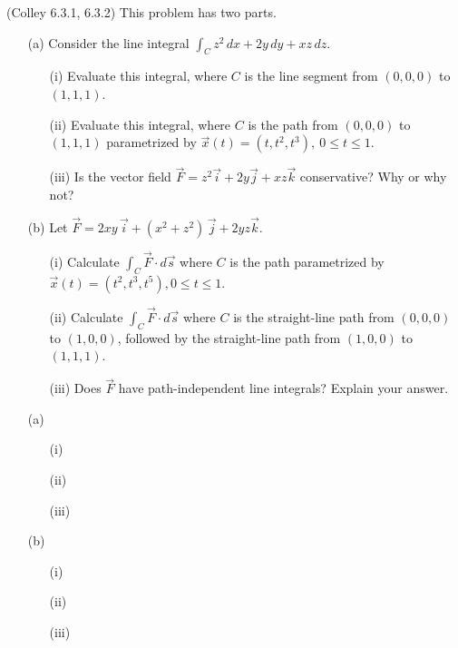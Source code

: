 \documentclass[11pt,letterpaper,cm]{nupset}
\begin{document}
\begin{problem}[Exercise 1] (Colley 6.3.1, 6.3.2) This problem has two parts.
	\begin{itemize}
		\item[(a)] Consider the line integral $\displaystyle \int_C z^2\,dx+2y\,dy+xz\,dz$.
		\begin{itemize}
			\item[(i)] Evaluate this integral, where $C$ is the line segment from $(0,0,0)$ to $(1,1,1)$.
			\item[(ii)] Evaluate this integral, where $C$ is the path from $(0,0,0)$ to $(1,1,1)$ parametrized by $\vec{x}(t) = (t, t^2, t^3),\ 0\le t\le 1$.
			\item[(iii)] Is the vector field $\vec{F} = z^2\vec{i}+2y\vec{j}+xz\vec{k}$ conservative? Why or why not?
		\end{itemize}
		\item[(b)] Let $\vec{F} = 2xy\,\vec{i}+(x^2+z^2)\,\vec{j}+2yz\vec{k}$.
		\begin{itemize}
			\item[(i)] Calculate $\displaystyle \int_C \vec{F} \cdot d\vec{s}$ where $C$ is the path parametrized by $\vec{x}(t)=(t^2,t^3,t^5), 0 \le t \le 1$.
			\item[(ii)] Calculate $\displaystyle\int_C \vec{F} \cdot d\vec{s}$ where $C$ is the straight-line path from $(0,0,0)$ to $(1,0,0)$, followed by the straight-line path from $(1,0,0)$ to $(1,1,1)$.
			\item[(iii)] Does $\vec{F}$ have path-independent line integrals? Explain your answer.
		\end{itemize}
	\end{itemize}
\end{problem}
\begin{solution}
		\begin{itemize}
		\item[(a)] 
		\begin{itemize}
			\item[(i)] 
			\item[(ii)] 
			\item[(iii)] 
		\end{itemize}
		\item[(b)] 
		\begin{itemize}
			\item[(i)] 
			\item[(ii)] 
			\item[(iii)] 
		\end{itemize}
	\end{itemize}
\end{solution}
\newpage
\end{document}
